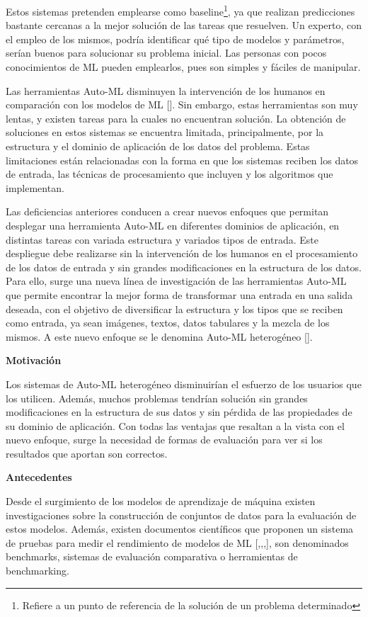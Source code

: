 Estos sistemas pretenden emplearse como baseline\footnote{Refiere a un punto de referencia de la solución de un problema determinado}, ya que realizan predicciones bastante 
cercanas a la mejor solución de las tareas que resuelven. Un experto, con el empleo de 
los mismos, podría identificar qué tipo de modelos y parámetros, serían buenos para solucionar su problema inicial. Las personas con pocos conocimientos de ML pueden 
emplearlos, pues son simples y fáciles de manipular.

Las herramientas Auto-ML disminuyen la intervención de los humanos en comparación con los modelos de ML [\cite{36}]. Sin embargo, estas herramientas son muy lentas, y 
existen tareas para la cuales no encuentran solución. La obtención de soluciones en estos sistemas se encuentra limitada, principalmente, por la estructura y el dominio 
de aplicación de los datos del problema. Estas limitaciones están relacionadas con la forma en que los sistemas reciben los datos de entrada, las técnicas 
de procesamiento que incluyen y los algoritmos que implementan. 

Las deficiencias anteriores conducen a crear nuevos enfoques que permitan desplegar una herramienta Auto-ML en diferentes dominios de aplicación, en distintas tareas 
con variada estructura y variados tipos de entrada. Este despliegue debe realizarse sin la intervención de los humanos en el procesamiento de los datos de entrada y 
sin grandes modificaciones en la estructura de los datos. Para ello, surge una nueva línea de investigación de las herramientas Auto-ML que permite encontrar 
la mejor forma de transformar una entrada en una salida deseada, con el objetivo de diversificar la estructura y los tipos que se reciben como entrada, ya sean imágenes, 
textos, datos tabulares y la mezcla de los mismos. A este nuevo enfoque se le denomina Auto-ML heterogéneo [\cite{33}].

\begin{flushleft} 
{\Large { \textbf{Motivación} }}
\end{flushleft}
Los sistemas de Auto-ML heterogéneo disminuirían el esfuerzo de los usuarios que los utilicen. Además, muchos problemas tendrían solución sin grandes modificaciones en 
la estructura de sus datos y sin pérdida de las propiedades de su dominio de aplicación. Con todas las ventajas que resaltan a la vista con el nuevo enfoque, 
surge la necesidad de formas de evaluación para ver si los resultados que aportan son correctos.

\begin{flushleft} 
    {\Large { \textbf{Antecedentes}}}
\end{flushleft}
Desde el surgimiento de los modelos de aprendizaje de máquina existen investigaciones sobre la construcción de conjuntos de datos para la evaluación de estos modelos. 
Además, existen documentos científicos que proponen un sistema de pruebas para medir el rendimiento de modelos de ML [\cite{1},\cite{3},\cite{2},\cite{7}], son denominados 
benchmarks, sistemas de evaluación comparativa o herramientas de benchmarking.

